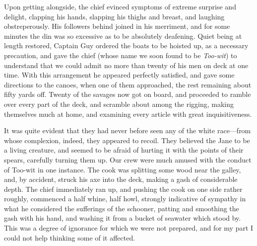 Upon getting alongside, the chief evinced symptoms of extreme surprise and
delight, clapping his hands, slapping his thighs and breast, and laughing
obstreperously. His followers behind joined in his merriment, and for some
minutes the din was so excessive as to be absolutely deafening. Quiet being at
length restored, Captain Guy ordered the boats to be hoisted up, as a necessary
precaution, and gave the chief (whose name we soon found to be \emph{Too-wit})
to understand that we could admit no more than twenty of his men on deck at one
time. With this arrangement he appeared perfectly satisfied, and gave some
directions to the canoes, when one of them approached, the rest remaining about
fifty yards off. Twenty of the savages now got on board, and proceeded to ramble
over every part of the deck, and scramble about among the rigging, making
themselves much at home, and examining every article with great
inquisitiveness. 

It was quite evident that they had never before seen any of the white
race---from whose complexion, indeed, they appeared to recoil. They believed the
Jane to be a living creature, and seemed to be afraid of hurting it with the
points of their spears, carefully turning them up. Our crew were much amused
with the conduct of Too-wit in one instance. The cook was splitting some wood
near the galley, and, by accident, struck his axe into the deck, making a gash
of considerable depth. The chief immediately ran up, and pushing the cook on one
side rather roughly, commenced a half whine, half howl, strongly indicative of
sympathy in what he considered the sufferings of the schooner, patting and
smoothing the gash with his hand, and washing it from a bucket of seawater which
stood by. This was a degree of ignorance for which we were not prepared, and for
my part I could not help thinking some of it affected. 

